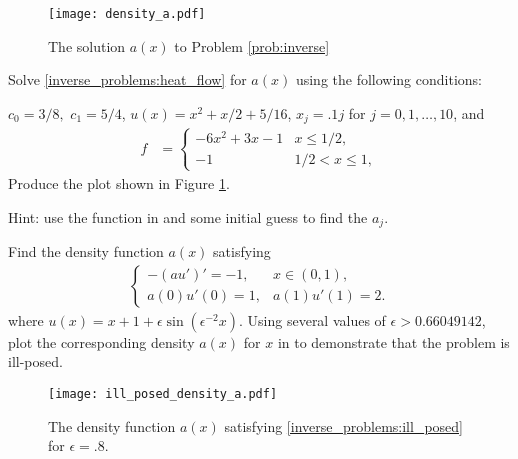 %
%
%
%
%
%
%
%
%

\begin{figure}
\centering
\texttt{[image: density\_a.pdf]}
\caption{The solution $a(x)$ to Problem \ref{prob:inverse}}
\label{fig:inverse_problems:num1}
\end{figure}

\begin{problem}
Solve \eqref{inverse_problems:heat_flow} for $a(x)$ using the following conditions:

\noindent $c_0 = 3/8,$ $c_1 = 5/4$, $u(x) = x^2 + x/2 + 5/16$, $x_j=.1j$ for $j=0,1,\dots,10$, and 
\begin{align*}
	f &= \begin{cases}
		-6x^2 + 3x - 1 & x \leq 1/2,\\
		-1 & 1/2 < x \leq 1,
	\end{cases}
\end{align*}
Produce the plot shown in Figure \ref{fig:inverse_problems:num1}.

Hint: use the  function in  and some initial guess to find the $a_j$.
\label{prob:inverse}
\end{problem}

\begin{problem}
	Find the density function $a(x)$ satisfying 
	\begin{align}
	\begin{cases}
		-(au')' = -1, & x \in (0,1),\\
		a(0)u'(0) = 1, & a(1)u'(1) = 2.
	\end{cases} \label{inverse_problems:ill_posed}
	\end{align}
	where $u(x) = x + 1 + \epsilon \sin(\epsilon^{-2}x)$. 
Using several values of $\epsilon  > 0.66049142$, plot the corresponding density $a(x)$ for $x$ in  to demonstrate that the problem is ill-posed.
\end{problem}

\begin{figure}
\centering
\texttt{[image: ill\_posed\_density\_a.pdf]}
\caption{The density function $a(x)$ satisfying \eqref{inverse_problems:ill_posed} for $\epsilon = .8$.}
\label{fig:inverse_problems:exercise1}
\end{figure}